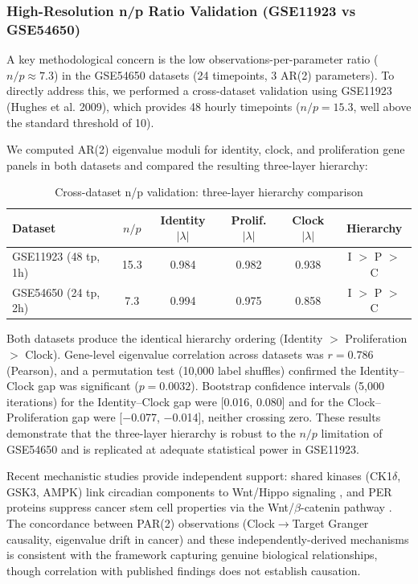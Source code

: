 \documentclass[11pt,a4paper]{article}
\begin{document}
\subsubsection{High-Resolution n/p Ratio Validation (GSE11923 vs GSE54650)}

A key methodological concern is the low observations-per-parameter ratio ($n/p \approx 7.3$) in the GSE54650 datasets (24 timepoints, 3 AR(2) parameters). To directly address this, we performed a cross-dataset validation using GSE11923 (Hughes et al. 2009), which provides 48 hourly timepoints ($n/p = 15.3$, well above the standard threshold of 10).

We computed AR(2) eigenvalue moduli for identity, clock, and proliferation gene panels in both datasets and compared the resulting three-layer hierarchy:

\begin{table}[H]
\centering
\caption{Cross-dataset n/p validation: three-layer hierarchy comparison}
\label{tab:np_validation}
\begin{tabular}{lccccc}
\toprule
Dataset & $n/p$ & Identity $|\lambda|$ & Prolif. $|\lambda|$ & Clock $|\lambda|$ & Hierarchy \\
\midrule
GSE11923 (48 tp, 1h) & 15.3 & 0.984 & 0.982 & 0.938 & I $>$ P $>$ C \\
GSE54650 (24 tp, 2h) & 7.3 & 0.994 & 0.975 & 0.858 & I $>$ P $>$ C \\
\bottomrule
\end{tabular}
\end{table}

Both datasets produce the identical hierarchy ordering (Identity $>$ Proliferation $>$ Clock). Gene-level eigenvalue correlation across datasets was $r = 0.786$ (Pearson), and a permutation test (10,000 label shuffles) confirmed the Identity--Clock gap was significant ($p = 0.0032$). Bootstrap confidence intervals (5,000 iterations) for the Identity--Clock gap were [0.016, 0.080] and for the Clock--Proliferation gap were [$-$0.077, $-$0.014], neither crossing zero. These results demonstrate that the three-layer hierarchy is robust to the $n/p$ limitation of GSE54650 and is replicated at adequate statistical power in GSE11923.

Recent mechanistic studies provide independent support: shared kinases (CK1$\delta$, GSK3, AMPK) link circadian components to Wnt/Hippo signaling \citep{liu2025genesdiseases}, and PER proteins suppress cancer stem cell properties via the Wnt/$\beta$-catenin pathway \citep{cellcommsignal2025per, li2021per3wnt}. The concordance between PAR(2) observations (Clock$\to$Target Granger causality, eigenvalue drift in cancer) and these independently-derived mechanisms is consistent with the framework capturing genuine biological relationships, though correlation with published findings does not establish causation.
\end{document}
